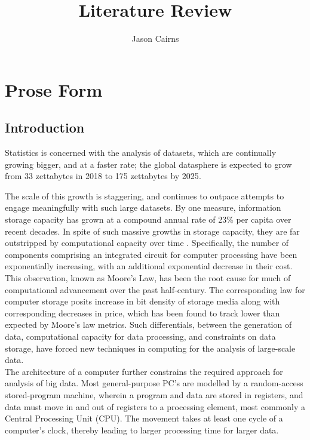 \documentclass[a4paper,10pt]{article}
\begin{document}
\title{Literature Review}
\author{Jason Cairns}
  
\maketitle{}

\tableofcontents

\section{Prose Form}


\subsection{Introduction}
Statistics is concerned with the analysis of datasets, which are continually growing bigger, and at a faster rate; the global datasphere is expected to grow from 33 zettabytes in 2018 to 175 zettabytes by 2025\cite{rydning2018digitization}.

The scale of this growth is staggering, and continues to outpace attempts to engage meaningfully with such large datasets. By one measure, information storage capacity has grown at a compound annual rate of 23\% per capita over recent decades\cite{hilbert2011world}.
In spite of such massive growths in storage capacity, they are far outstripped by computational capacity over time \cite{fontana2018moore}.
Specifically, the number of components comprising an integrated circuit for computer processing have been exponentially increasing, with an additional exponential decrease in their cost\cite{moore1975progress}.
This observation, known as Moore's Law, has been the root cause for much of computational advancement over the past half-century.
The corresponding law for computer storage posits increase in bit density of storage media along with corresponding decreases in price, which has been found to track lower than expected by Moore's law metrics.
Such differentials, between the generation of data, computational capacity for data processing, and constraints on data storage, have forced new techniques in computing for the analysis of large-scale data.\\

The architecture of a computer further constrains the required approach for analysis of big data.
Most general-purpose PC's are modelled by a random-access stored-program machine, wherein a program and data are stored in registers, and data must move in and out of registers to a processing element, most commonly a Central Processing Unit (CPU). 
The movement takes at least one cycle of a computer's clock, thereby leading to larger processing time for larger data.\\
\end{document}
